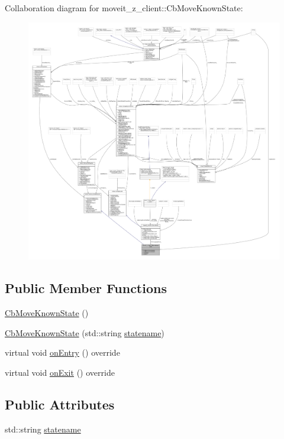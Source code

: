 Collaboration diagram for moveit\+\_\+z\+\_\+client\+:\+:Cb\+Move\+Known\+State\+:
\nopagebreak
\begin{figure}[H]
\begin{center}
\leavevmode
\includegraphics[width=350pt]{classmoveit__z__client_1_1CbMoveKnownState__coll__graph}
\end{center}
\end{figure}
\subsection*{Public Member Functions}
\begin{DoxyCompactItemize}
\item 
\hyperlink{classmoveit__z__client_1_1CbMoveKnownState_a2ea70daeb91cf4933d784de3a2189218}{Cb\+Move\+Known\+State} ()
\item 
\hyperlink{classmoveit__z__client_1_1CbMoveKnownState_a979cd1c7a80b314c921c8ff89867a3fa}{Cb\+Move\+Known\+State} (std\+::string \hyperlink{classmoveit__z__client_1_1CbMoveKnownState_a53449b08ffa077adb2f1d4efbd37f8d0}{statename})
\item 
virtual void \hyperlink{classmoveit__z__client_1_1CbMoveKnownState_a2ac90afe89043bbbf35c5b63eb428430}{on\+Entry} () override
\item 
virtual void \hyperlink{classmoveit__z__client_1_1CbMoveKnownState_a336ec449b5ad07a37731f0a782b12a67}{on\+Exit} () override
\end{DoxyCompactItemize}
\subsection*{Public Attributes}
\begin{DoxyCompactItemize}
\item 
std\+::string \hyperlink{classmoveit__z__client_1_1CbMoveKnownState_a53449b08ffa077adb2f1d4efbd37f8d0}{statename}
\end{DoxyCompactItemize}

